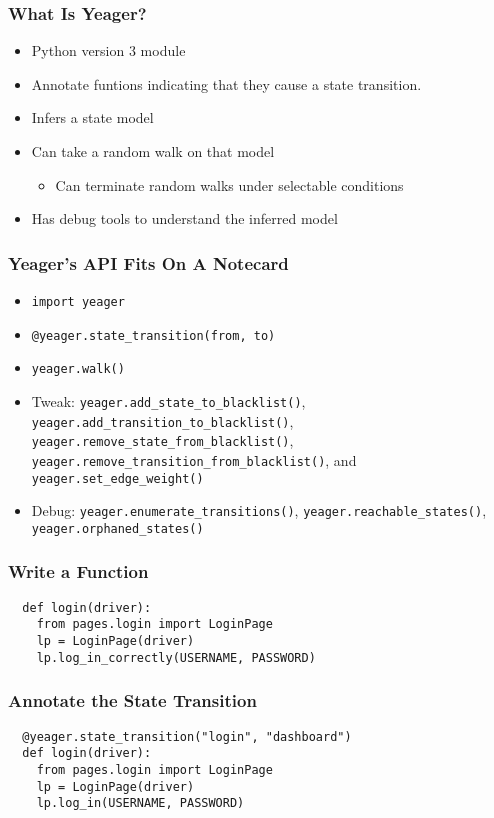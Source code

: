 \begin{frame}
  \frametitle{What Is Yeager?}
  \begin{itemize}
    \item Python version 3 module
    \item Annotate funtions indicating that they cause a state transition.
    \item Infers a state model
    \item Can take a random walk on that model
    \begin{itemize}
      \item Can terminate random walks under selectable conditions
    \end{itemize}
    \item Has debug tools to understand the inferred model
  \end{itemize}
\end{frame}

\begin{frame}
  \frametitle{Yeager's API Fits On A Notecard}
  \begin{itemize}
    \item \texttt{import yeager}
    \item \texttt{@yeager.state\_transition(from, to)}
    \item \texttt{yeager.walk()}
    \item Tweak: \texttt{yeager.add\_state\_to\_blacklist()}, \texttt{yeager.add\_transition\_to\_blacklist()}, \texttt{yeager.remove\_state\_from\_blacklist()}, \texttt{yeager.remove\_transition\_from\_blacklist()}, and \texttt{yeager.set\_edge\_weight()}
    \item Debug: \texttt{yeager.enumerate\_transitions()}, \texttt{yeager.reachable\_states()}, \texttt{yeager.orphaned\_states()}
  \end{itemize}
\end{frame}

\begin{frame}[fragile]
  \frametitle{Write a Function}
  \begin{lstlisting}
  def login(driver):
    from pages.login import LoginPage
    lp = LoginPage(driver)
    lp.log_in_correctly(USERNAME, PASSWORD)
  \end{lstlisting}
\end{frame}

\begin{frame}[fragile]
  \frametitle{Annotate the State Transition}
  \begin{lstlisting}
  @yeager.state_transition("login", "dashboard")
  def login(driver):
    from pages.login import LoginPage
    lp = LoginPage(driver)
    lp.log_in(USERNAME, PASSWORD)
  \end{lstlisting}
\end{frame}

